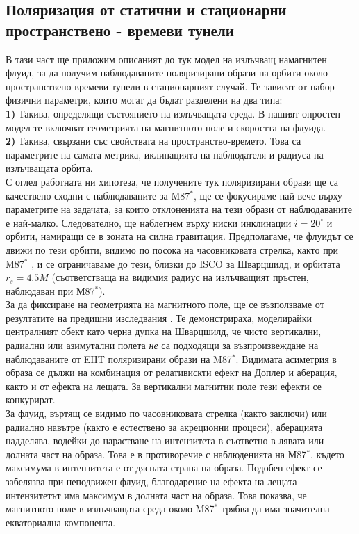 \subsection{Поляризация от статични и стационарни пространствено - времеви тунели}
В тази част ще приложим описаният до тук модел на излъчващ намагнитен флуид, за да получим наблюдаваните поляризирани образи на орбити около пространствено-времеви тунели в стационарният случай. Те зависят от набор физични параметри, които могат да бъдат разделени на два типа:\\

\textbf{1)} Такива, определящи състоянието на излъчващата среда. В нашият опростен модел те включват геометрията на магнитното поле и скоростта на флуида.\\

\textbf{2)} Такива, свързани със свойствата на пространство-времето. Това са параметрите на самата метрика, иклинацията на наблюдателя и радиуса на излъчващата орбита.\\

С оглед работната ни хипотеза, че получените тук поляризирани образи ще са качествено сходни с наблюдаваните за M87$^*$, ще се фокусираме най-вече върху параметрите на задачата, за които отклоненията на тези образи от наблюдаваните е най-малко. Следователно, ще наблегнем върху ниски инклинации $i = 20^\circ$ и орбити, намиращи се в зоната на силна гравитация. Предполагаме, че флуидът се движи по тези орбити, видимо по посока на часовниковата стрелка, както при M87$^*$ \cite{EHT_M87_V}, и се ограничаваме до тези, близки до ISCO за Шварцшилд, и орбитата $r_s = 4.5M$ (съответстваща на видимия радиус на излъчващият пръстен, наблюдаван при М87$^*$). \\

За да фиксиране на геометрията на магнитното поле, ще се възползваме от резултатите на предишни изследвания \cite{Narayan2021}. Те демонстрираха, моделирайки централният обект като черна дупка на Шварцшилд, че чисто вертикални, радиални или азимутални полета \emph{не} са подходящи за възпроизвеждане на наблюдаваните от EHT поляризирани образи на M87$^*$. Видимата асиметрия в образа се дължи на комбинация от релативискти ефект на Доплер и аберация, както и от ефекта на лещата. За вертикални магнитни поле тези ефекти се конкурират.\\

За флуид, въртящ се видимо по часовниковата стрелка (както \cite{EHT_M87_V} заключи) или радиално навътре (както е естествено за акреционни процеси), аберацията надделява, водейки до нарастване на интензитета в съответно в лявата или долната част на образа. Това е в противоречие с наблюденията на М87$^*$, където максимума в интензитета е от дясната страна на образа. Подобен ефект се забелязва при неподвижен флуид, благодарение на ефекта на лещата - интензитетът има максимум в долната част на образа. Това показва, че магнитното поле в излъчващата среда около M87$^*$ трябва да има значителна екваториална компонента. \\

